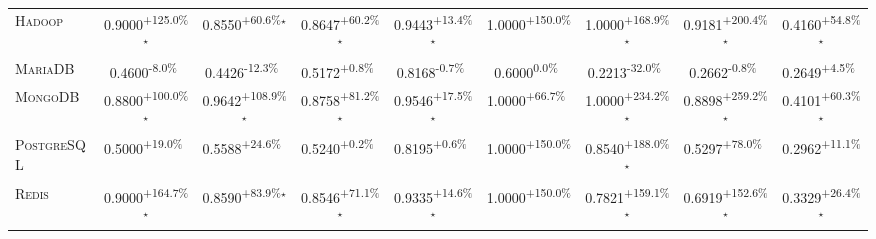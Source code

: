 \begin{table}[htbp]
\begin{tabular}{l|cccc|cccc}
\textsc{Hadoop} & \cellcolor{green!30}0.9000\textsuperscript{+125.0\%}$^\star$ & \cellcolor{green!30}0.8550\textsuperscript{+60.6\%}$^\star$ & \cellcolor{green!30}0.8647\textsuperscript{+60.2\%}$^\star$ & \cellcolor{green!30}0.9443\textsuperscript{+13.4\%}$^\star$ & \cellcolor{green!30}1.0000\textsuperscript{+150.0\%}$^{\,\,\,}$ & \cellcolor{green!30}1.0000\textsuperscript{+168.9\%}$^\star$ & \cellcolor{green!30}0.9181\textsuperscript{+200.4\%}$^\star$ & \cellcolor{green!30}0.4160\textsuperscript{+54.8\%}$^\star$ \\
\textsc{MariaDB} & \cellcolor{red!30}0.4600\textsuperscript{-8.0\%}$^{\,\,\,}$ & \cellcolor{red!30}0.4426\textsuperscript{-12.3\%}$^{\,\,\,}$ & \cellcolor{green!30}0.5172\textsuperscript{+0.8\%}$^{\,\,\,}$ & \cellcolor{red!30}0.8168\textsuperscript{-0.7\%}$^{\,\,\,}$ & \cellcolor{red!30}0.6000\textsuperscript{0.0\%}$^{\,\,\,}$ & \cellcolor{red!30}0.2213\textsuperscript{-32.0\%}$^{\,\,\,}$ & \cellcolor{red!30}0.2662\textsuperscript{-0.8\%}$^{\,\,\,}$ & \cellcolor{green!30}0.2649\textsuperscript{+4.5\%}$^{\,\,\,}$ \\
\textsc{MongoDB} & \cellcolor{green!30}0.8800\textsuperscript{+100.0\%}$^\star$ & \cellcolor{green!30}0.9642\textsuperscript{+108.9\%}$^\star$ & \cellcolor{green!30}0.8758\textsuperscript{+81.2\%}$^\star$ & \cellcolor{green!30}0.9546\textsuperscript{+17.5\%}$^\star$ & \cellcolor{green!30}1.0000\textsuperscript{+66.7\%}$^{\,\,\,}$ & \cellcolor{green!30}1.0000\textsuperscript{+234.2\%}$^\star$ & \cellcolor{green!30}0.8898\textsuperscript{+259.2\%}$^\star$ & \cellcolor{green!30}0.4101\textsuperscript{+60.3\%}$^\star$ \\
\textsc{PostgreSQL} & \cellcolor{green!30}0.5000\textsuperscript{+19.0\%}$^{\,\,\,}$ & \cellcolor{green!30}0.5588\textsuperscript{+24.6\%}$^{\,\,\,}$ & \cellcolor{green!30}0.5240\textsuperscript{+0.2\%}$^{\,\,\,}$ & \cellcolor{green!30}0.8195\textsuperscript{+0.6\%}$^{\,\,\,}$ & \cellcolor{green!30}1.0000\textsuperscript{+150.0\%}$^{\,\,\,}$ & \cellcolor{green!30}0.8540\textsuperscript{+188.0\%}$^\star$ & \cellcolor{green!30}0.5297\textsuperscript{+78.0\%}$^{\,\,\,}$ & \cellcolor{green!30}0.2962\textsuperscript{+11.1\%}$^{\,\,\,}$ \\
\textsc{Redis} & \cellcolor{green!30}0.9000\textsuperscript{+164.7\%}$^\star$ & \cellcolor{green!30}0.8590\textsuperscript{+83.9\%}$^\star$ & \cellcolor{green!30}0.8546\textsuperscript{+71.1\%}$^\star$ & \cellcolor{green!30}0.9335\textsuperscript{+14.6\%}$^\star$ & \cellcolor{green!30}1.0000\textsuperscript{+150.0\%}$^{\,\,\,}$ & \cellcolor{green!30}0.7821\textsuperscript{+159.1\%}$^\star$ & \cellcolor{green!30}0.6919\textsuperscript{+152.6\%}$^\star$ & \cellcolor{green!30}0.3329\textsuperscript{+26.4\%}$^\star$ \\

\end{tabular}
\end{table}
